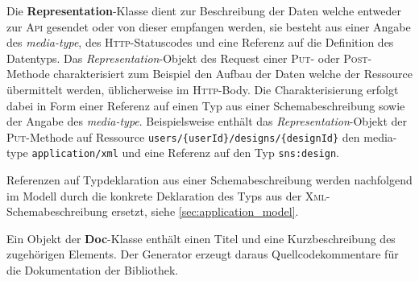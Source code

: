 Die \textbf{Representation}-Klasse dient zur Beschreibung der Daten welche entweder zur \textsc{Api} gesendet oder von dieser empfangen werden, sie besteht aus einer Angabe des \emph{media-type}, des \textsc{Http}-Statuscodes und eine Referenz auf die Definition des Datentyps. Das \emph{Representation}-Objekt des Request einer \textsc{Put}- oder \textsc{Post}-Methode charakterisiert zum Beispiel den Aufbau der Daten welche der Ressource übermittelt werden, üblicherweise im \textsc{Http}-Body. Die Charakterisierung erfolgt dabei in Form einer Referenz auf einen Typ aus einer Schemabeschreibung sowie der Angabe des \emph{media-type}. Beispielsweise enthält das \emph{Representation}-Objekt der \textsc{Put}-Methode auf Ressource \texttt{users/\{userId\}/designs/\{designId\}} den media-type \texttt{application/xml} und eine Referenz auf den Typ \texttt{sns:design}. 

Referenzen auf Typdeklaration aus einer Schemabeschreibung werden nachfolgend im Modell durch die konkrete Deklaration des Typs aus der \textsc{Xml}-Schemabeschreibung ersetzt, siehe \cref{sec:application_model}. 

Ein Objekt der \textbf{Doc}-Klasse enthält einen Titel und eine Kurzbeschreibung des zugehörigen Elements.
Der Generator erzeugt daraus Quellcodekommentare für die Dokumentation der Bibliothek.